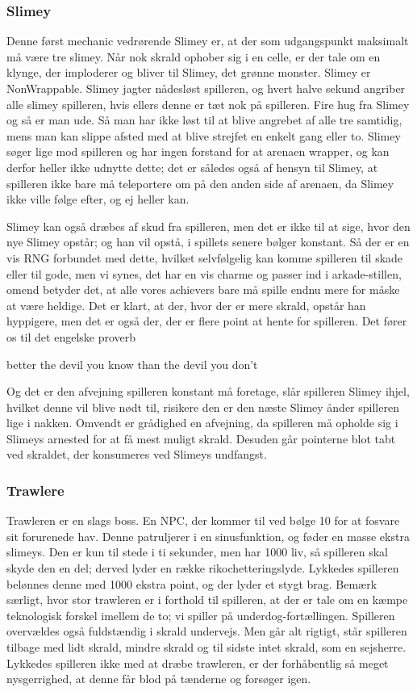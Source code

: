 \subsubsection{Slimey}
Denne først mechanic vedrørende Slimey er, at der som udgangspunkt maksimalt må være tre slimey. Når nok skrald ophober sig i en celle, er der tale om en klynge, der imploderer og bliver til Slimey, det grønne monster. Slimey er NonWrappable. Slimey jagter nådesløst spilleren, og hvert halve sekund angriber alle slimey spilleren, hvis ellers denne er tæt nok på spilleren. Fire hug fra Slimey og så er man ude. Så man har ikke løst til at blive angrebet af alle tre samtidig, mens man kan slippe afsted med at blive strejfet en enkelt gang eller to. Slimey søger lige mod spilleren og har ingen forstand for at arenaen wrapper, og kan derfor heller ikke udnytte dette; det er således også af hensyn til Slimey, at spilleren ikke bare må teleportere om på den anden side af arenaen, da Slimey ikke ville følge efter, og ej heller kan.

Slimey kan også dræbes af skud fra spilleren, men det er ikke til at sige, hvor den nye Slimey opstår; og han vil opstå, i spillets senere bølger konstant. Så der er en vis RNG forbundet med dette, hvilket selvfølgelig kan komme spilleren til skade eller til gode, men vi synes, det har en vis charme og passer ind i arkade-stillen, omend betyder det, at alle vores achievers bare må spille endnu mere for måske at være heldige. Det er klart, at der, hvor der er mere skrald, opstår han hyppigere, men det er også der, der er flere point at hente for spilleren. Det fører os til det engelske proverb

\begin{displayquote}
better the devil you know than the devil you don't
\end{displayquote}
Og det er den afvejning spilleren konstant må foretage, slår spilleren Slimey ihjel, hvilket denne vil blive nødt til, risikere den er den næste Slimey ånder spilleren lige i nakken. Omvendt er grådighed en afvejning, da spilleren må opholde sig i Slimeys arnested for at få mest muligt skrald. Desuden går pointerne blot tabt ved skraldet, der konsumeres ved Slimeys undfangst.

\subsubsection{Trawlere}
Trawleren er en slags boss. En NPC, der kommer til ved bølge 10 for at fosvare sit forurenede hav. Denne patruljerer i en sinusfunktion, og føder en masse ekstra slimeys. Den er kun til stede i ti sekunder, men har 1000 liv, så spilleren skal skyde den en del; derved lyder en række rikochetteringslyde. Lykkedes spilleren belønnes denne med 1000 ekstra point, og der lyder et stygt brag. Bemærk særligt, hvor stor trawleren er i forthold til spilleren, at der er tale om en kæmpe teknologisk forskel imellem de to; vi spiller på underdog-fortællingen. Spilleren overvældes også fuldstændig i skrald undervejs. Men går alt rigtigt, står spilleren tilbage med lidt skrald, mindre skrald og til sidste intet skrald, som en sejsherre. Lykkedes spilleren ikke med at dræbe trawleren, er der forhåbentlig så meget nysgerrighed, at denne får blod på tænderne og forsøger igen.

